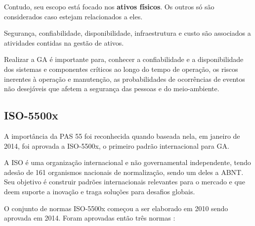 Contudo, seu escopo está focado nos \textbf{ativos físicos}. Os outros só são considerados caso estejam relacionados a eles.

Segurança, confiabilidade, disponibilidade, infraestrutura e custo são associados a atividades contidas na gestão de ativos. 

Realizar a GA é importante para, conhecer a confiabilidade e a disponibilidade dos sistemas e componentes críticos ao longo do tempo de operação, os riscos inerentes à operação e manutenção, as probabilidades de ocorrências de eventos não desejáveis que afetem a segurança das pessoas e do meio-ambiente.


\subsection{ISO-5500x}

A importância da PAS 55 foi reconhecida quando baseada nela, em janeiro de 2014, foi aprovada a ISO-5500x, o primeiro padrão internacional para GA. 

A ISO é uma organização internacional e não governamental independente, tendo adesão de 161 organismos nacionais de normalização, sendo um deles a ABNT. Seu objetivo é construir padrões internacionais relevantes para o mercado e que deem suporte a inovação e traga soluções para desafios globais.

O conjunto de normas ISO-5500x começou a ser elaborado em 2010 sendo aprovada em 2014. Foram aprovadas então três normas \cite{abraman}:

